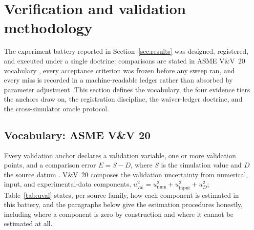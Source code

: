 \section{Verification and validation methodology}
\label{sec:methodology}

The experiment battery reported in Section~\ref{sec:results} was designed,
registered, and executed under a single doctrine: comparisons are stated in
ASME V\&V~20 vocabulary \citep{asme2009vv20}, every acceptance criterion was
frozen before any sweep ran, and every miss is recorded in a machine-readable
ledger rather than absorbed by parameter adjustment. This section defines the
vocabulary, the four evidence tiers the anchors draw on, the registration
discipline, the waiver-ledger doctrine, and the cross-simulator oracle
protocol.

\subsection{Vocabulary: ASME V\&V 20}

Every validation anchor declares a validation variable, one or more
validation points, and a comparison error $E = S - D$, where $S$ is the
simulation value and $D$ the source datum \citep{asme2009vv20}. V\&V~20
composes the validation uncertainty from numerical, input, and
experimental-data components,
$u_{\mathrm{val}}^2 = u_{\mathrm{num}}^2 + u_{\mathrm{input}}^2 + u_D^2$;
Table~\ref{tab:uval} states, per source family, how each component is
estimated in this battery, and the paragraphs below give the estimation
procedures honestly, including where a component is zero by construction
and where it cannot be estimated at all.

